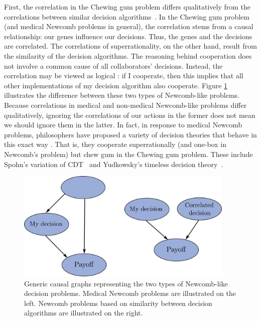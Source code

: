 First, the correlation in the Chewing gum problem differs qualitatively
from the correlations between similar decision algorithms~\parencite{OesterheldTreutlein2017}.
In the Chewing gum problem (and
medical Newcomb problems in general), the correlation stems from a
causal relationship: our genes influence our decisions. Thus, the genes
and the decisions are correlated. The correlations of superrationality,
on the other hand, result from the similarity of the decision
algorithms. The reasoning behind cooperation does not involve a common
cause of all collaborators' decisions. Instead, the correlation may be
viewed as logical \parencite{Garrabrant2016-km}: if I
cooperate, then this implies that all other implementations of my decision algorithm
also cooperate. Figure \ref{two-types} illustrates the difference between
these two types of Newcomb-like problems. Because correlations in
medical and non-medical Newcomb-like problems differ qualitatively,
ignoring the correlations of our actions in the former does not mean we
should ignore them in the latter. In fact, in response to medical
Newcomb problems, philosophers have proposed a variety of decision
theories that behave in this exact way \parencite{OesterheldTreutlein2017}. That is, they cooperate
superrationally (and one-box in
Newcomb's problem) but chew gum in the Chewing gum problem. These
include Spohn's variation of CDT~\citeyear{Spohn2003-zf,Spohn2005-tm,Spohn2012-fo} and Yudkowsky's
timeless decision theory~\citeyear{Yudkowsky2010-ul}.

\begin{figure}
    \centering
    \includegraphics[width=4.1in]{figs/two-types}
    \caption{Generic causal graphs representing the two types of Newcomb-like decision problems. Medical Newcomb problems are illustrated on the left. Newcomb problems based on similarity between decision algorithms are illustrated on the right.}
    \label{two-types}
\end{figure}

